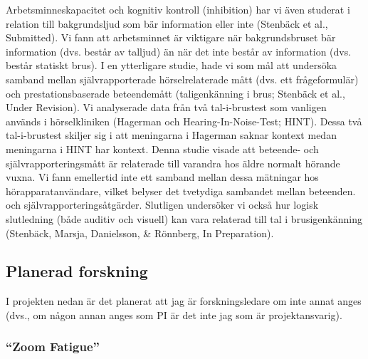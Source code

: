 \documentclass[]{article}
\begin{document}
Arbetsminneskapacitet och kognitiv kontroll (inhibition) har vi även
studerat i relation till bakgrundsljud som bär information eller inte
(Stenbäck et al., Submitted). Vi fann att arbetsminnet är viktigare när
bakgrundsbruset bär information (dvs. består av talljud) än när det inte
består av information (dvs. består statiskt brus). I en ytterligare
studie, hade vi som mål att undersöka samband mellan självrapporterade
hörselrelaterade mått (dvs. ett frågeformulär) och prestationsbaserade
beteendemått (taligenkänning i brus; Stenbäck et al., Under Revision).
Vi analyserade data från två tal-i-brustest som vanligen används i
hörselkliniken (Hagerman och Hearing-In-Noise-Test; HINT). Dessa två
tal-i-brustest skiljer sig i att meningarna i Hagerman saknar kontext
medan meningarna i HINT har kontext. Denna studie visade att beteende-
och självrapporteringsmått är relaterade till varandra hos äldre normalt
hörande vuxna. Vi fann emellertid inte ett samband mellan dessa
mätningar hos hörapparatanvändare, vilket belyser det tvetydiga
sambandet mellan beteenden. och självrapporteringsåtgärder. Slutligen
undersöker vi också hur logisk slutledning (både auditiv och visuell)
kan vara relaterad till tal i brusigenkänning (Stenbäck, Marsja,
Danielsson, \& Rönnberg, In Preparation).

\hypertarget{planerad-forskning}{%
\subsection{Planerad forskning}\label{planerad-forskning}}

I projekten nedan är det planerat att jag är forskningsledare om inte
annat anges (dvs., om någon annan anges som PI är det inte jag som är
projektansvarig).

\hypertarget{zoom-fatigue}{%
\subsubsection{``Zoom Fatigue''}\label{zoom-fatigue}}
\end{document}
